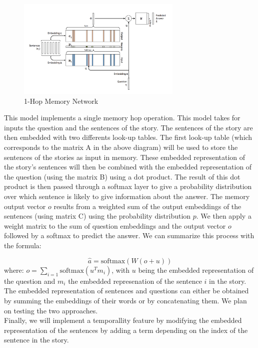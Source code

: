 \documentclass[paper=a4, fontsize=11pt]{scrartcl} %
\numberwithin{equation}{section} %
\numberwithin{figure}{section} %
\numberwithin{table}{section} %
\begin{document}
\begin{figure}[H]
\begin{center}
    \includegraphics[width=0.7\textwidth]{mem.png}
    \caption{1-Hop Memory Network}
\end{center}
\end{figure}

This model implements a single memory hop operation. This model takes for inputs the question and the sentences of the story. The sentences of the story are then embedded with two differents look-up tables. The first look-up table (which corresponds to the matrix A in the above diagram) will be used to store the sentences of the stories as input in memory. These embedded representation of the story's sentences will then be combined with the embedded representation of the question (using the matrix B) using a dot product. The result of this dot product is then passed through a softmax layer to give a probability distribution over which sentence is likely to give information about the answer. The memory output vector $o$ results from a weighted sum of the output embeddings of the sentences (using matrix C) using the probability distribution $p$. We then apply a weight matrix to the sum of question embeddings and the output vector $o$ followed by a softmax to predict the answer. We can summarize this process with the formula:

$$\hat{a} = \text{softmax}\left(W(o+u)\right)$$
where: $ o = \sum\limits_{i=1}\text{softmax}(u^Tm_i)$, with $u$ being the embedded representation of the question and $m_i$ the embedded represenation of the sentence $i$ in the story.\\

The embedded representation of sentences and questions can either be obtained by summing the embeddings of their words or by concatenating them. We plan on testing the two approaches.\\

Finally, we will implement a temporallity feature by modifying the embedded representation of the sentences by adding a term depending on the index of the sentence in the story.
\end{document}
